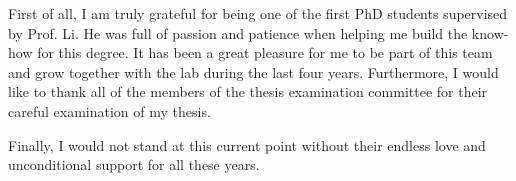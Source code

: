 \acknowledgments

First of all, I am truly grateful for being one of the first PhD students supervised by Prof. Li.
He was full of passion and patience when helping me build the know-how for this degree. It has been a great pleasure for me to be part of this team and grow together with the lab during the last four years. Furthermore, I would like to thank all of the members of the thesis examination committee for their careful examination of my thesis.

Finally, I would not stand at this current point without their endless love and unconditional support for all these years.

\endacknowledgments
